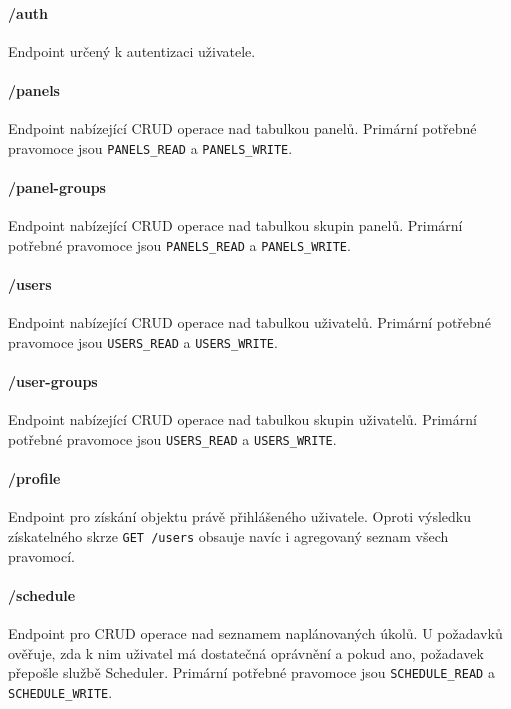 \paragraph*{/auth}
Endpoint určený k autentizaci uživatele.

\paragraph*{/panels}
Endpoint nabízející CRUD operace nad tabulkou panelů. Primární potřebné pravomoce jsou \lstinline{PANELS_READ} a \lstinline{PANELS_WRITE}.

\paragraph*{/panel-groups}
Endpoint nabízející CRUD operace nad tabulkou skupin panelů. Primární potřebné pravomoce jsou \lstinline{PANELS_READ} a \lstinline{PANELS_WRITE}.

\paragraph*{/users}
Endpoint nabízející CRUD operace nad tabulkou uživatelů. Primární potřebné pravomoce jsou \lstinline{USERS_READ} a \lstinline{USERS_WRITE}.

\paragraph*{/user-groups}
Endpoint nabízející CRUD operace nad tabulkou skupin uživatelů. Primární potřebné pravomoce jsou \lstinline{USERS_READ} a \lstinline{USERS_WRITE}.

\paragraph*{/profile}
Endpoint pro získání objektu právě přihlášeného uživatele. Oproti výsledku získatelného skrze \lstinline|GET /users| obsauje navíc i agregovaný seznam všech pravomocí.

\paragraph*{/schedule}
Endpoint pro CRUD operace nad seznamem naplánovaných úkolů. U požadavků ověřuje, zda k nim uživatel má dostatečná oprávnění a pokud ano, požadavek přepošle službě Scheduler. Primární potřebné pravomoce jsou \lstinline{SCHEDULE_READ} a \lstinline{SCHEDULE_WRITE}.

